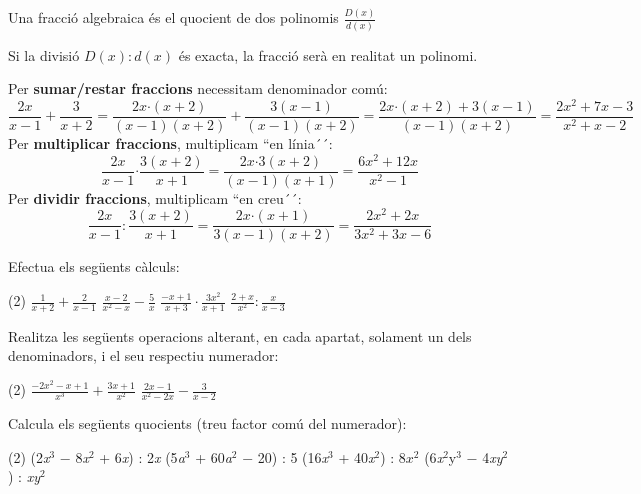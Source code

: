 \begin{theorybox}

 Una fracció algebraica és el quocient de dos polinomis $\frac{D\left(x\right)}{d\left(x\right)}$

 Si la divisió $D(x):d(x)$ és exacta, la fracció serà en realitat un polinomi.

 Per \textbf{sumar/restar fraccions} necessitam denominador comú:
\[\frac{2x}{x-1}+\frac{3}{x+2}=\frac{2x\textrm{·}(x+2)}{(x-1)(x+2)}+\frac{3(x-1)}{(x-1)(x+2)}=\frac{2x\textrm{·}\left(x+2\right)+3\left(x-1\right)}{(x-1)(x+2)}=\frac{2x^2+7x-3}{x^2+x-2}\] 
Per \textbf{multiplicar fraccions}, multiplicam ``en línia´´:
\[\frac{2x}{x-1}\textrm{·}\frac{3(x+2)}{x+1}=\frac{2x\textrm{·}3(x+2)}{(x-1)(x+1)}=\frac{6x^2+12x}{x^2-1}\] 
Per \textbf{dividir fraccions}, multiplicam ``en creu´´:
\[\frac{2x}{x-1}:\frac{3(x+2)}{x+1}=\frac{2x\textrm{·}(x+1)}{3(x-1)(x+2)}=\frac{2x^2+2x}{3x^2+3x-6}\] 
\end{theorybox}

\begin{mylist}

\exer[1]  Efectua els següents càlculs: 

\begin{tasks}(2)
	\task  $\frac{1}{x+2} +\frac{2}{x-1} $   
	\task $\frac{x-2}{x^{2} -x} -\frac{5}{x} $   
	\task $\frac{-x+1}{x+3} \cdot \frac{3x^{2} }{x+1} $   
	\task $\frac{2+x}{x^{2} } :\frac{x}{x-3} $
\end{tasks}

\exer[1]  Realitza les següents operacions alterant, en cada apartat, solament un dels denominadors, i el seu respectiu numerador: 

\begin{tasks}(2)
	\task $\frac{-2x^{2} -x+1}{x^{3} } +\frac{3x+1}{x^{2} } $    
	\task $\frac{2x-1}{x^{2} -2x} -\frac{3}{x-2} $
\end{tasks}

\exer  Calcula els següents quocients (treu factor comú del numerador):  

\begin{tasks}(2)
	\task  (2\textit{x}${}^{3}$ $-$ 8\textit{x}${}^{2}$ + 6\textit{x}) : 2\textit{x    }
	\task  (5\textit{a}${}^{ 3}$ + 60\textit{a${}^{ 2}$} $-$ 20) : 5  
	\task  (16\textit{x}${}^{3}$ + 40\textit{x}${}^{2}$) : 8${x}^{2 }$   
	\task  (6\textit{x}${}^{2}$y${}^{3}$ $-$ 4\textit{xy${}^{2}$}) : \textit{xy}${}^{2}$
\end{tasks}
\answers{[$x^2-4x+3$, $a^3+12a^2-4$, $2x+5$, $6xy-4$]}


\end{mylist}
 
